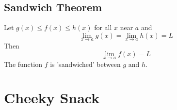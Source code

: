 \documentclass[a4paper,twoside,10pt]{article}
\begin{document}
		\subsection{Sandwich Theorem}
			Let $g(x)\leq f(x)\leq h(x)$ for all $x$ near $a$ and
			\[
				\lim_{x\to a}g(x)=\lim_{x\to a}h(x)=L
			\]
			Then
			\[
				\lim_{x\to a}f(x)=L
			\]
			The function $f$ is 'sandwiched' between $g$ and $h$.
	\newpage
	
	\section{Cheeky Snack}
\end{document}

